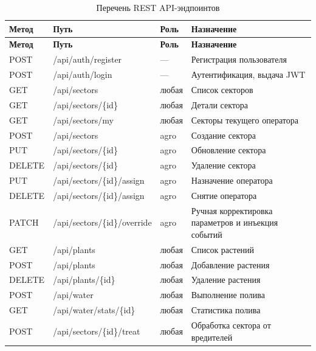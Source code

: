 \begin{longtable}{|l|l|l|p{4.8cm}|}
    \caption{Перечень REST API-эндпоинтов} \label{tab:api_endpoints} \\

    \hline
    \textbf{Метод} & \textbf{Путь} & \textbf{Роль} & \textbf{Назначение} \\ \hline
    \endfirsthead

    \tabcont{\ref{tab:api_endpoints}}
    \textbf{Метод} & \textbf{Путь} & \textbf{Роль} & \textbf{Назначение} \\ \hline
    \endhead

    \hline
    \endfoot

    POST & /api/auth/register & --- & Регистрация пользователя \\ \hline
    POST & /api/auth/login    & --- & Аутентификация, выдача JWT \\ \hline
    GET  & /api/sectors       & любая & Список секторов \\ \hline
    GET  & /api/sectors/\{id\}  & любая & Детали сектора \\ \hline
    GET  & /api/sectors/my    & любая & Секторы текущего оператора \\ \hline
    POST & /api/sectors       & agro  & Создание сектора \\ \hline
    PUT  & /api/sectors/\{id\}  & agro  & Обновление сектора \\ \hline
    DELETE & /api/sectors/\{id\} & agro & Удаление сектора \\ \hline
    PUT  & /api/sectors/\{id\}/assign & agro & Назначение оператора \\ \hline
    DELETE & /api/sectors/\{id\}/assign & agro & Снятие оператора \\ \hline
    PATCH & /api/sectors/\{id\}/override & agro & Ручная корректировка параметров и инъекция событий \\ \hline
    GET  & /api/plants        & любая & Список растений \\ \hline
    POST & /api/plants        & любая & Добавление растения \\ \hline
    DELETE & /api/plants/\{id\} & любая & Удаление растения \\ \hline
    POST & /api/water         & любая & Выполнение полива \\ \hline
    GET  & /api/water/stats/\{id\} & любая & Статистика полива \\ \hline
    POST & /api/sectors/\{id\}/treat & любая & Обработка сектора от вредителей \\ \hline

\end{longtable}
